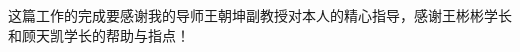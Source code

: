 
\begin{acknowledgements}
  这篇工作的完成要感谢我的导师王朝坤副教授对本人的精心指导，感谢王彬彬学长和顾天凯学长的帮助与指点！
\end{acknowledgements}
